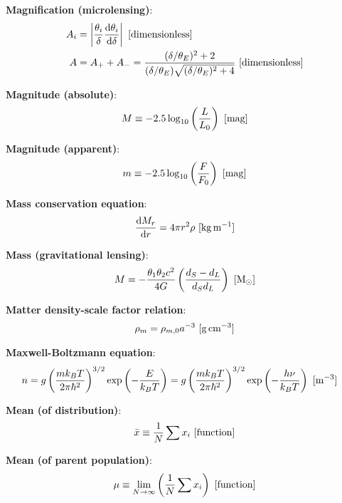 \documentclass[a4paper,10pt]{article}
\begin{document}
{\noindent}\textbf{Magnification (microlensing)}:
\begin{align*}
    A_i &= \left\lvert \frac{\theta_i}{\delta}\frac{{\rm d}\theta_i}{{\rm d}\delta} \right\rvert ~ [{\rm dimensionless}] \\
    A &= A_+ + A_- = \frac{(\delta/\theta_E)^2+2}{(\delta/\theta_E)\sqrt{(\delta/\theta_E)^2+4}} ~ [{\rm dimensionless}]
\end{align*}

{\noindent}\textbf{Magnitude (absolute)}:
\begin{align*}
    M \equiv -2.5\log_{10}\left(\frac{L}{L_0}\right) ~ [{\rm mag}]
\end{align*}

{\noindent}\textbf{Magnitude (apparent)}:
\begin{align*}
    m \equiv -2.5\log_{10}\left(\frac{F}{F_0}\right) ~ [{\rm mag}]
\end{align*}

{\noindent}\textbf{Mass conservation equation}:
\begin{align*}
    \frac{{\rm d}M_r}{{\rm d}r} = 4\pi r^2\rho ~ [{\rm kg\,m^{-1}}]
\end{align*}

{\noindent}\textbf{Mass (gravitational lensing)}:
\begin{align*}
    M = -\frac{\theta_1\theta_2c^2}{4G} \left(\frac{d_S-d_L}{d_Sd_L}\right) ~ [{\rm M_\odot}]
\end{align*}

{\noindent}\textbf{Matter density-scale factor relation}:
\begin{align*}
    \rho_m = \rho_{m,0}a^{-3} ~ [{\rm g\,cm^{-3}}]
\end{align*}

{\noindent}\textbf{Maxwell-Boltzmann equation}:
\begin{align*}
    n &= g\left(\frac{mk_BT}{2\pi\hbar^2}\right)^{3/2}\exp\left(-\frac{E}{k_BT}\right) = g\left(\frac{mk_BT}{2\pi\hbar^2}\right)^{3/2}\exp\left(-\frac{h\nu}{k_BT}\right) ~ [{\rm m^{-3}}]
\end{align*}

{\noindent}\textbf{Mean (of distribution)}:
\begin{align*}
    \bar{x} \equiv \frac{1}{N} \sum x_i ~ [{\rm function}]
\end{align*}

{\noindent}\textbf{Mean (of parent population)}:
\begin{align*}
    \mu \equiv \lim_{N\rightarrow\infty}\left( \frac{1}{N} \sum x_i \right) ~ [{\rm function}]
\end{align*}
\end{document}
